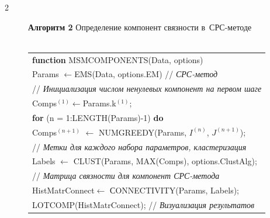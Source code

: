\begin{multicols}{2}
\begin{figure}

{\small \begin{center}

\textbf{Алгоритм 2} Определение компонент связности в~СРС-методе\\

{\ }\\[-6pt]

\begin{tabular}{l}

\hline

\textbf{function} {\normalsize MSMC}OMPONENTS({Data, options})\\

\hspace*{5mm}Params $\gets${\normalsize EM}S(Data, options.EM) // \textit{СРС-метод}\\

\hspace*{5mm}// \textit{Инициализация числом ненулевых компонент на первом шаге}\\

\hspace*{5mm}Comps$^{(1)}$$\gets$Params.k$^{(1)}$;\\

\hspace*{5mm}\textbf{for} (n = 1:LENGTH(Params)-1) \textbf{do}\\

\hspace*{10mm}Comps$^{(n+1)}$ $\gets$ {\normalsize N}UM{\normalsize G}REEDY({Params, $ I^{(n)}$, $J^{(n+1)}$});\\

\hspace*{5mm}// \textit{Метки для каждого набора параметров, кластеризация}\\

\hspace*{5mm}Labels $\gets$ {\normalsize C}LUST(Params, {MAX}(Comps), options.ClustAlg);\\

\hspace*{5mm}// \textit{Матрица связности для компонент СРС-метода}\\

\hspace*{5mm}HistMatrConnect$\gets$ {\normalsize С}ONNECTIVITY({Params, Labels});  \\

\hspace*{5mm}{\normalsize P}LOT{\normalsize C}OMP(HistMatrConnect); // \textit{Визуализация результатов}\\


\end{tabular}
\end{center}}
\end{figure}
\end{multicols}
